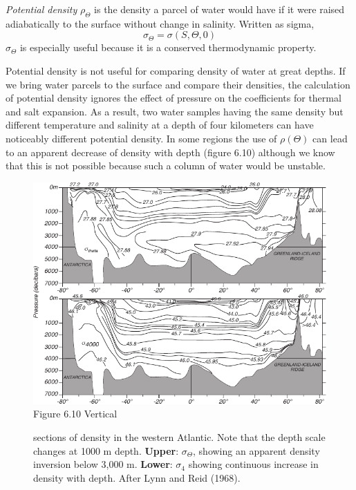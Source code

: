 \textit{Potential density} $\rho _{\Theta}$ is the density a parcel of
water would have if it were raised adiabatically to the surface
without change in salinity. Written as sigma,
\begin{equation}
\sigma _{\Theta} = \sigma(S, \Theta, 0)
\end{equation}
$\sigma _{\Theta}$ is especially useful because it is a conserved
thermodynamic property.

Potential density is not useful for comparing density of water at
great depths. If we bring water parcels to the surface and compare
their densities, the calculation of potential density ignores the
effect of pressure on the coefficients for thermal and salt
expansion. As a result, two water samples having the same density but
different temperature and salinity at a depth of four kilometers can
have noticeably different potential density. In some regions the use
of $\rho(\Theta)$ can lead to an apparent decrease of density with
depth (figure 6.10) although we know that this is not possible because
such a column of water would be unstable.

\begin{figure}[b!]
\vspace{-2ex}
\includegraphics{pics/atlsection}
\footnotesize
Figure 6.10 Vertical \rule{0mm}{4ex}sections of density in the western
Atlantic.  Note that the depth scale changes at 1000 m
depth. \textbf{Upper}: $\sigma _{\Theta}$, showing an apparent density
inversion below 3,000 m. \textbf{Lower}: $\sigma _4$ showing
continuous increase in density with depth. After Lynn and Reid (1968).
\label{fig:atlsection4}
\end{figure}

